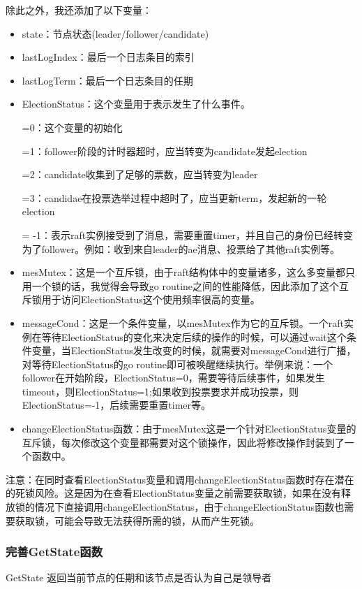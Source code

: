 \documentclass[]{article}
\begin{document}
	除此之外，我还添加了以下变量：
	\begin{itemize}
	\item state：节点状态(leader/follower/candidate)
	\item lastLogIndex：最后一个日志条目的索引
	\item lastLogTerm：最后一个日志条目的任期
	\item ElectionStatus：这个变量用于表示发生了什么事件。
	
	=0：这个变量的初始化
	
	=1：follower阶段的计时器超时，应当转变为candidate发起election
	
	=2：candidate收集到了足够的票数，应当转变为leader
	
	=3：candidae在投票选举过程中超时了，应当更新term，发起新的一轮election
	
	= -1：表示raft实例接受到了消息，需要重置timer，并且自己的身份已经转变为了follower。例如：收到来自leader的ae消息、投票给了其他raft实例等。
	
	\item mesMutex：这是一个互斥锁，由于raft结构体中的变量诸多，这么多变量都只用一个锁的话，我觉得会导致go routine之间的性能降低，因此添加了这个互斥锁用于访问ElectionStatus这个使用频率很高的变量。
	
	\item messageCond：这是一个条件变量，以mesMutex作为它的互斥锁。一个raft实例在等待ElectionStatus的变化来决定后续的操作的时候，可以通过wait这个条件变量，当ElectionStatus发生改变的时候，就需要对messageCond进行广播，对等待ElectionStatus的go routine即可被唤醒继续执行。举例来说：一个follower在开始阶段，ElectionStatus=0，需要等待后续事件，如果发生timeout，则ElectionStatus=1;如果收到投票要求并成功投票，则ElectionStatus=-1，后续需要重置timer等。
	
	\item changeElectionStatus函数：由于mesMutex这是一个针对ElectionStatus变量的互斥锁，每次修改这个变量都需要对这个锁操作，因此将修改操作封装到了一个函数中。
	\end{itemize}
	\par
	注意：在同时查看ElectionStatus变量和调用changeElectionStatus函数时存在潜在的死锁风险。这是因为在查看ElectionStatus变量之前需要获取锁，如果在没有释放锁的情况下直接调用changeElectionStatus，由于changeElectionStatus函数也需要获取锁，可能会导致无法获得所需的锁，从而产生死锁。
	\subsubsection{完善GetState函数}
	GetState 返回当前节点的任期和该节点是否认为自己是领导者
\end{document}
